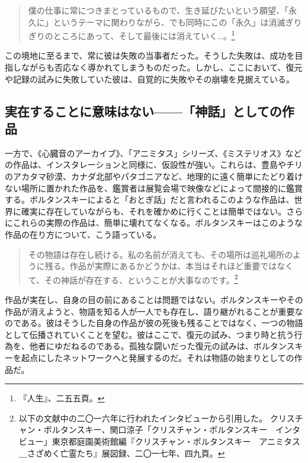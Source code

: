 \documentclass[b5j,twoside,twocolumn]{utarticle}
\begin{document}
\begin{quote}
僕の仕事に常につきまとっているもので、生き延びたいという願望、「永久に」というテーマに関わりながら、でも同時にこの「永久」は消滅ぎりぎりのところにあって、そして最後には消えていく…。\footnote{『人生』、二五五頁。}
\end{quote}


この境地に至るまで、常に彼は失敗の当事者だった。そうした失敗は、成功を目指しながらも否応なく導かれてしまうものだった。しかし、ここにおいて、復元や記録の試みに失敗していた彼は、自覚的に失敗やその崩壊を見据えている。

\subsection{実在することに意味はない\tbaselineshift =3.0pt------「神話」としての作品}
一方で、《心臓音のアーカイブ》、「アニミタス」シリーズ、《ミステリオス》などの作品は、インスタレーションと同様に、仮設性が強い。これらは、豊島やチリのアカタマ砂漠、カナダ北部やパタゴニアなど、地理的に遠く簡単にたどり着けない場所に置かれた作品を、鑑賞者は展覧会場で映像などによって間接的に鑑賞する。ボルタンスキーによると「おとぎ話」だと言われるこのような作品は、世界に確実に存在していながらも、それを確かめに行くことは簡単ではない。さらにこれらの実際の作品は、簡単に壊れてなくなる。ボルタンスキーはこのような作品の在り方について、こう語っている。
\begin{quote}
その物語は存在し続ける。私の名前が消えても、その場所は巡礼場所のように残る。作品が実際にあるかどうかは、本当はそれほど重要ではなくて、その神話が存在する、ということが大事なのです。\footnote{以下の文献中の二〇一六年に行われたインタビューから引用した。
クリスチャン・ボルタンスキー、関口涼子「クリスチャン・ボルタンスキー　インタビュー」東京都庭園美術館編『クリスチャン・ボルタンスキー　アニミタス＿さざめく亡霊たち』展図録、二〇一七年、四九頁。}
\end{quote}


作品が実在し、自身の目の前にあることは問題ではない。ボルタンスキーやその作品が消えようと、物語を知る人が一人でも存在し、語り継がれることが重要なのである。彼はそうした自身の作品が彼の死後も残ることではなく、一つの物語として伝播されていくことを望む。彼はここで、復元の試み、つまり時と抗う行為を、他者にゆだねるのである。孤独な闘いだった復元の試みは、ボルタンスキーを起点にしたネットワークへと発展するのだ。それは物語の始まりとしての作品だ。
\end{document}

